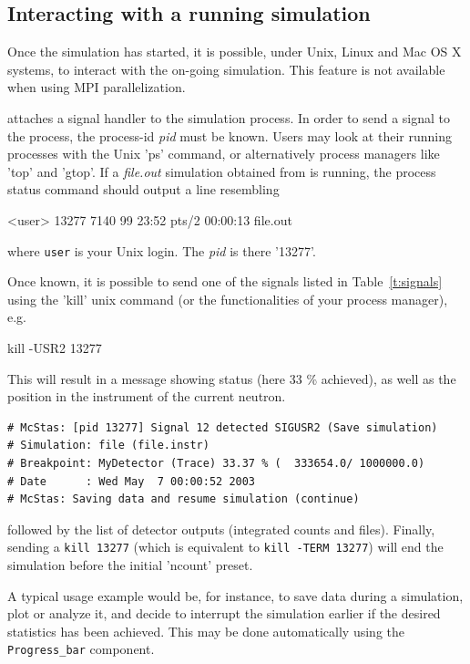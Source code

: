 \subsection{Interacting with a running simulation}

Once the simulation has started, it is possible, under Unix, Linux and Mac OS X systems, to interact with the on-going simulation. This feature is not available when using MPI parallelization.

\MCS attaches a signal handler to the simulation process. In order to send a signal to the process, the process-id {\it pid} must be known. Users may look at their running processes with the Unix 'ps' command, or alternatively process managers like 'top' and 'gtop'.
If a {\it file.out} simulation obtained from \MCS is running, the process status command should output a line resembling

\begin{bash}
<user> 13277 7140 99 23:52 pts/2   00:00:13   file.out
\end{bash}

where \verb+user+ is your Unix login. The {\it pid} is there '13277'.

Once known, it is possible to send one of the signals listed in Table~\ref{t:signals} using the 'kill' unix command (or the functionalities of your process manager), e.g.
\begin{bash}
    kill -USR2 13277
\end{bash}

This will result in a message showing status (here 33 \% achieved), as well as the position in the instrument of the current neutron.
\begin{lstlisting}
# McStas: [pid 13277] Signal 12 detected SIGUSR2 (Save simulation)
# Simulation: file (file.instr)
# Breakpoint: MyDetector (Trace) 33.37 % (  333654.0/ 1000000.0)
# Date      : Wed May  7 00:00:52 2003
# McStas: Saving data and resume simulation (continue)
\end{lstlisting}
followed by the list of detector outputs (integrated counts and files). Finally, sending a \verb+kill 13277+ (which is equivalent to \verb+kill -TERM 13277+) will end the simulation before the initial 'ncount' preset.

A typical usage example would be, for instance, to save data during a
simulation, plot or analyze it, and decide to interrupt the simulation earlier
if the desired statistics has been achieved. This may be done automatically
using the \verb+Progress_bar+ component.

